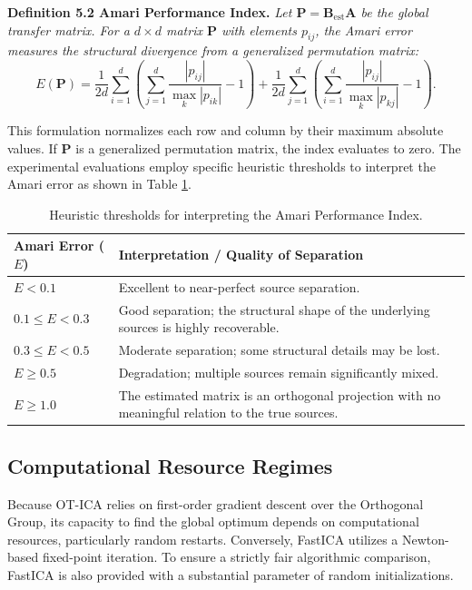 \documentclass[12pt,a4paper,twoside,openany]{book}
\begin{document}
\vspace{0.5em}
\noindent\textbf{Definition 5.2 Amari Performance Index.} \textit{Let $\mathbf{P} = \mathbf{B}_{\text{est}} \mathbf{A}$ be the global transfer matrix. 
For a $d \times d$ matrix $\mathbf{P}$ with elements $p_{ij}$, the Amari error measures the structural divergence from a generalized permutation matrix:}
\begin{equation}
    E(\mathbf{P}) = \frac{1}{2d} \sum_{i=1}^d \left( \sum_{j=1}^d \frac{|p_{ij}|}{\max_k |p_{ik}|} - 1 \right) + \frac{1}{2d} \sum_{j=1}^d \left( \sum_{i=1}^d \frac{|p_{ij}|}{\max_k |p_{kj}|} - 1 \right).
\end{equation}
\vspace{0.5em}

This formulation normalizes each row and column by their maximum absolute values. 
If $\mathbf{P}$ is a generalized permutation matrix, the index evaluates to zero. 
The experimental evaluations employ specific heuristic thresholds to interpret the Amari error as shown in Table \ref{tab:amari_thresholds}.

\begin{table}[htbp]
    \centering
    \begin{tabular}{@{}lp{10cm}@{}}
        \toprule
        \textbf{Amari Error ($E$)} & \textbf{Interpretation / Quality of Separation} \\
        \midrule
        $E < 0.1$ & Excellent to near-perfect source separation. \\
        \addlinespace
        $0.1 \le E < 0.3$ & Good separation; the structural shape of the underlying sources is highly recoverable. \\
        \addlinespace
        $0.3 \le E < 0.5$ & Moderate separation; some structural details may be lost. \\
        \addlinespace
        $E \ge 0.5$ & Degradation; multiple sources remain significantly mixed. \\
        \addlinespace
        $E \ge 1.0$ & The estimated matrix is an orthogonal projection with no meaningful relation to the true sources. \\
        \bottomrule
    \end{tabular}
    \caption{Heuristic thresholds for interpreting the Amari Performance Index.}
    \label{tab:amari_thresholds}
\end{table}

\subsection{Computational Resource Regimes}
Because OT-ICA relies on first-order gradient descent over the Orthogonal Group, 
its capacity to find the global optimum depends on computational resources, particularly random restarts. 
Conversely, FastICA utilizes a Newton-based fixed-point iteration. To ensure a strictly fair algorithmic comparison, 
FastICA is also provided with a substantial parameter of random initializations. 
\end{document}
